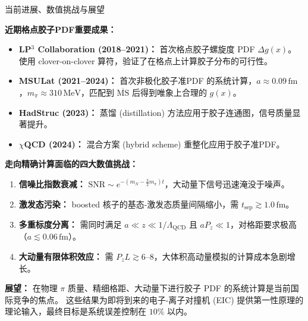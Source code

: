 \documentclass[10pt,aspectratio=169]{beamer}
\newcommand{\msbar}{\overline{\mathrm{MS}}}
\newcommand{\lqcd}{\Lambda_{\mathrm{QCD}}}
\newcommand{\MeV}{\,\mathrm{MeV}}
\newcommand{\fm}{\,\mathrm{fm}}
\begin{document}
\begin{frame}{当前进展、数值挑战与展望}

  \textbf{近期格点胶子PDF重要成果：}
  \begin{itemize}
    \item \textbf{LP$^3$ Collaboration (2018--2021)：} 首次格点胶子螺旋度 PDF $\Delta g(x)$。使用 clover-on-clover 算符，验证了在格点上计算胶子分布的可行性。
    \item \textbf{MSULat (2021--2024)：} 首次非极化胶子准PDF 的系统计算，$a \approx 0.09\fm$，$m_\pi \approx 310\MeV$，匹配到 $\msbar$ 后得到唯象上合理的 $g(x)$。
    \item \textbf{HadStruc (2023)：} 蒸馏 (distillation) 方法应用于胶子连通图，信号质量显著提升。
    \item \textbf{$\chi$QCD (2024)：} 混合方案 (hybrid scheme) 重整化应用于胶子准PDF。
  \end{itemize}

  \textbf{走向精确计算面临的四大数值挑战：}
  \begin{enumerate}
    \item \textbf{信噪比指数衰减：} $\mathrm{SNR} \sim e^{-(m_N - \frac{3}{2}m_\pi)t}$，大动量下信号迅速淹没于噪声。
    \item \textbf{激发态污染：} boosted 核子的基态-激发态质量间隔缩小，需 $t_{\mathrm{sep}} \gtrsim 1.0\fm$。
    \item \textbf{多重标度分离：} 需同时满足 $a \ll z \ll 1/\lqcd$ 且 $aP_z \ll 1$，对格距要求极高（$a \lesssim 0.06\fm$）。
    \item \textbf{大动量有限体积效应：} 需 $P_z L \gtrsim 6$--$8$，大体积高动量模拟的计算成本急剧增长。
  \end{enumerate}

  \textbf{展望：} 在物理 $\pi$ 质量、精细格距、大动量下进行胶子 PDF 的系统计算是当前国际竞争的焦点。
  这些结果为即将到来的电子-离子对撞机 (EIC) 提供第一性原理的理论输入，最终目标是系统误差控制在 $10\%$ 以内。


\end{frame}
\end{document}
